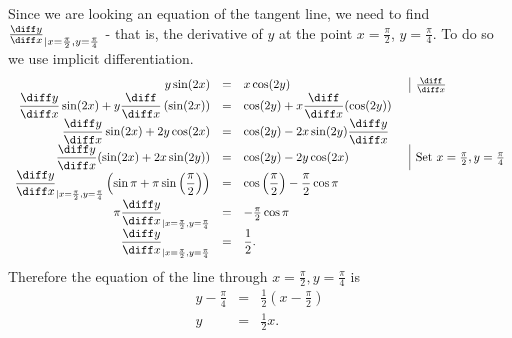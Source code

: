 {Since we are looking an equation of the tangent line, we need to find  $\frac{\diff y}{\diff x}_{|x=\frac{\pi}{2}, y= \frac{\pi}{4}}$ - that is, the derivative of $y$ at the point $x=\frac{\pi}{2}$, $y= \frac{\pi}{4}$. To do so we use implicit differentiation.
\[
\begin{array}{rcll|l}
\displaystyle y \sin (2x)&=&\displaystyle x\cos (2y)&&\frac{\diff }{\diff x}\\
\displaystyle \frac{\diff y}{\diff x} \sin (2x) +y \frac{\diff }{\diff x}\left(\sin (2x)\right)&=&\displaystyle  \cos (2y)+x\frac{\diff }{\diff x}(\cos (2y))\\
\displaystyle \frac{\diff y}{\diff x}\sin (2x)+2y\cos (2x)&= & \displaystyle \cos (2y)-2x \sin (2y) \frac{\diff y}{\diff x}\\
\displaystyle \frac{\diff y}{\diff x}(\sin (2x)+2x\sin (2y))&=&\displaystyle \cos (2y)-2y\cos (2x)&& \text{Set }x=\frac{ \pi}{2}, y=\frac{\pi}{4}\\
\displaystyle \frac{\diff y}{\diff x}_{|x=\frac{\pi}{2}, y=\frac{\pi}{4}} \left(\sin \pi+\pi \sin \left(\frac{\pi}{2}\right)\right)&=& \displaystyle \cos \left(\frac{\pi}{2}\right)-\frac{\pi}{2}\cos \pi\\
\displaystyle \pi \frac{\diff y}{\diff x}_{|x=\frac{\pi}{2}, y=\frac{\pi}{4}} &=& -\frac{\pi}{2}\cos \pi\\
\displaystyle \frac{\diff y}{\diff x}_{|x=\frac{\pi}{2}, y=\frac{\pi}{4}}&=& \displaystyle \frac{1}{2}.
\end{array}
\]
Therefore the equation of the line through $x=\frac{\pi}{2}, y=\frac{\pi}{4}$ is 
\[
\begin{array}{rcl}
\displaystyle y-\frac{\pi}{4}&=&\displaystyle \frac{1}{2}\left( x-\frac{\pi}{2} \right)\\
y&=&\displaystyle \frac{1}{2} x .
\end{array}
\]
}